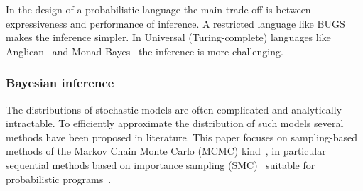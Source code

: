 In the design of a probabilistic language the main trade-off is between
expressiveness and performance of inference. A restricted language like
BUGS~\cite{bugs} makes the inference simpler. In Universal
(Turing-complete) languages like Anglican~\cite{anglican} and
Monad-Bayes~\cite{mbayes} the inference is more challenging.

\subsubsection{Bayesian inference}

The distributions of stochastic models are often complicated and analytically
intractable. To efficiently approximate the distribution of such models several
methods have been proposed in literature. This paper focuses on sampling-based
methods of the Markov Chain Monte Carlo (MCMC) kind~\cite{mcmc}, in particular sequential
methods based on importance sampling (SMC)~\cite{smcgordon,smcdoucet} suitable
for probabilistic programs~\cite{wood}.


